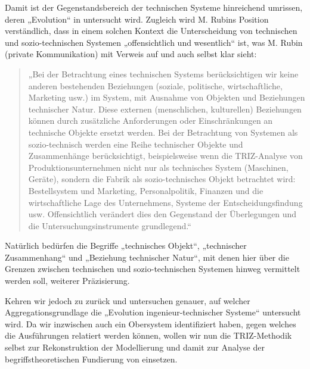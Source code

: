 \documentclass[11pt,a4paper]{article}
\begin{document}
Damit ist der Gegenstandsbereich der technischen Systeme hinreichend umrissen,
deren „Evolution“ in \cite{TESE2018} untersucht wird. Zugleich wird M. Rubins
Position verständlich, dass in einem solchen Kontext die Unterscheidung von
technischen und sozio-technischen Systemen „offensichtlich und wesentlich“
ist, was M. Rubin (private Kommunikation) mit Verweis auf \cite{Rubin2007} und
\cite{Rubin2010} auch selbst klar sieht:
\begin{quote}
  „Bei der Betrachtung eines technischen Systems berücksichtigen wir keine
  anderen bestehenden Beziehungen (soziale, politische, wirtschaftliche,
  Marketing usw.) im System, mit Ausnahme von Objekten und Beziehungen
  technischer Natur. Diese externen (menschlichen, kulturellen) Beziehungen
  können durch zusätzliche Anforderungen oder Einschränkungen an technische
  Objekte ersetzt werden.  Bei der Betrachtung von Systemen als
  sozio-technisch werden eine Reihe technischer Objekte und Zusammenhänge
  berücksichtigt, beispielsweise wenn die TRIZ-Analyse von
  Produktionsunternehmen nicht nur als technisches System (Maschinen, Geräte),
  sondern die Fabrik als sozio-technisches Objekt betrachtet wird:
  Bestellsystem und Marketing, Personalpolitik, Finanzen und die
  wirtschaftliche Lage des Unternehmens, Systeme der Entscheidungsfindung usw.
  Offensichtlich verändert dies den Gegenstand der Überlegungen und die
  Untersuchungsinstrumente grundlegend.“
\end{quote}
Natürlich bedürfen die Begriffe „technisches Objekt“, „technischer
Zusammenhang“ und „Beziehung technischer Natur“, mit denen hier über die
Grenzen zwischen technischen und sozio-technischen Systemen hinweg vermittelt
werden soll, weiterer Präzisierung.

Kehren wir jedoch zu \cite{TESE2018} zurück und untersuchen genauer, auf
welcher Aggregationsgrundlage die „Evolution ingenieur-technischer Systeme“
untersucht wird.  Da wir inzwischen auch ein Obersystem identifiziert haben,
gegen welches die Ausführungen relatiert werden können, wollen wir nun die
TRIZ-Methodik selbst zur Rekonstruktion der Modellierung und damit zur Analyse
der begriffstheoretischen Fundierung von \cite{TESE2018} einsetzen.
\end{document}
